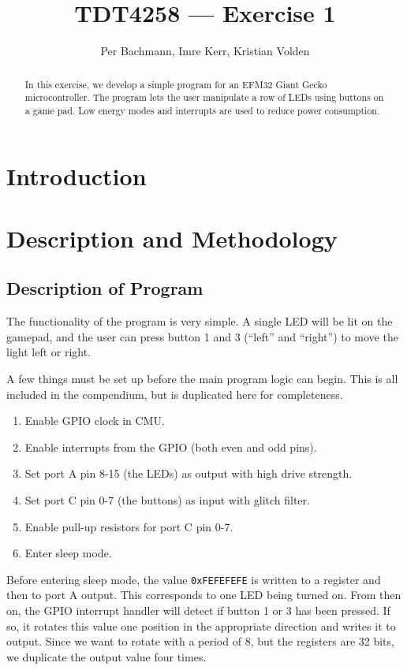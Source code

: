 \documentclass[a4paper, 12pt]{article}
\title{TDT4258 --- Exercise 1}
\author{Per Bachmann, Imre Kerr, Kristian Volden}
\begin{document}
\maketitle
\begin{abstract}
In this exercise, we develop a simple program for an EFM32 Giant Gecko microcontroller. The program lets the user manipulate a row of LEDs using buttons on a game pad. Low energy modes and interrupts are used to reduce power consumption.
\end{abstract}
\section{Introduction} %
\label{sec:introduction}


\section{Description and Methodology} %
\label{sec:description_and_methodology}
    \subsection{Description of Program} %
    \label{sub:description_of_program}
        The functionality of the program is very simple. A single LED will be lit on the gamepad, and the user can press button 1 and 3 (``left'' and ``right'') to move the light left or right.

        A few things must be set up before the main program logic can begin. This is all included in the compendium, but is duplicated here for completeness.

        \begin{enumerate}
            \item Enable GPIO clock in CMU.
            \item Enable interrupts from the GPIO (both even and odd pins).
            \item Set port A pin 8-15 (the LEDs) as output with high drive strength.
            \item Set port C pin 0-7 (the buttons) as input with glitch filter.
            \item Enable pull-up resistors for port C pin 0-7.
            \item Enter sleep mode.
        \end{enumerate}

        Before entering sleep mode, the value \texttt{0xFEFEFEFE} is written to a register and then to port A output. This corresponds to one LED being turned on. From then on, the GPIO interrupt handler will detect if button 1 or 3 has been pressed. If so, it rotates this value one position in the appropriate direction and writes it to output. Since we want to rotate with a period of 8, but the registers are 32 bits, we duplicate the output value four times.
\end{document}
